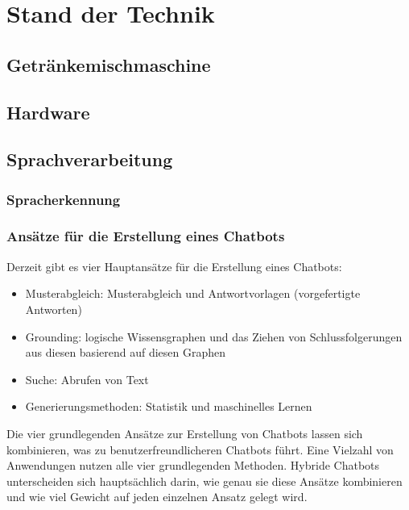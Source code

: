 \chapter{Stand der Technik}
\section{Getränkemischmaschine}
\section{Hardware}
\section{Sprachverarbeitung}
\subsection{Spracherkennung}
\subsection{Ansätze für die Erstellung eines Chatbots}\label{sec:ansaetze_erstellung_chatbots}
Derzeit gibt es vier Hauptansätze für die Erstellung eines Chatbots:
\begin{itemize}
    \item Musterabgleich: Musterabgleich und Antwortvorlagen (vorgefertigte Antworten)
    \item Grounding: logische Wissensgraphen und das Ziehen von Schlussfolgerungen aus diesen basierend auf diesen Graphen
    \item Suche: Abrufen von Text
    \item Generierungsmethoden: Statistik und maschinelles Lernen
\end{itemize}
Die vier grundlegenden Ansätze zur Erstellung von Chatbots lassen sich kombinieren, was zu benutzerfreundlicheren Chatbots führt. 
Eine Vielzahl von Anwendungen nutzen alle vier grundlegenden Methoden. 
Hybride Chatbots unterscheiden sich hauptsächlich darin, wie genau sie diese Ansätze kombinieren und wie viel Gewicht auf jeden einzelnen Ansatz gelegt wird.
